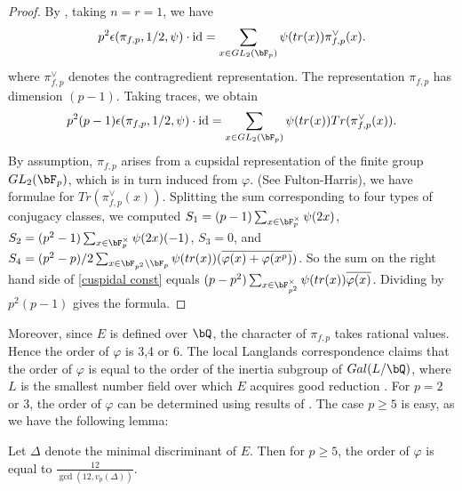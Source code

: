 \documentclass [11pt, proquest] {uwthesis}[2015/03/03]
\begin{document}
\begin{proof}
By \cite{bushnell2006local}, taking $n =  r = 1$, we have 
\begin{equation} 
	p^2 \epsilon(\pi_{f,p}, 1/2, \psi) \cdot \text{id} = \sum_{x \in GL_2(\bF_p)} \psi(tr(x)) \pi_{f,p}^{\vee}(x).
\end{equation}
where $\pi_{f,p}^{\vee}$ denotes the contragredient representation. The representation $\pi_{f,p}$ has dimension $(p-1)$.
Taking traces, we obtain 
\begin{equation} \label{cuspidal const}
	p^2 (p-1) \epsilon(\pi_{f,p}, 1/2, \psi) \cdot \text{id} = \sum_{x \in GL_2(\bF_p)} \psi(tr(x)) Tr(\pi_{f,p}^{\vee}(x)).
\end{equation}
By assumption, $\pi_{f,p}$ arises from a cupsidal representation of the finite group $GL_2(\bF_p)$, which is in turn induced from $\varphi$. (See Fulton-Harris), we have formulae for $Tr(\pi_{f,p}^{\vee}(x))$. Splitting the sum corresponding to four types of conjugacy classes, we computed $S_1 =  (p-1)  \sum_{x \in \bF_p^{\times}} \psi(2x)$, $S_2 = (p^2-1) \sum_{x \in \bF_p^{\times}} \psi(2x) (-1)$, $S_3 = 0$, and $S_4=  (p^2-p)/2 \sum_{x \in \bF_{p^2} \setminus \bF_p} \psi(tr(x))(\overline{\varphi(x) + \varphi(x^p)})$. So the sum on the right hand side of \ref{cuspidal const}  equals $(p-p^2) \sum_{x \in \bF_{p^2}^{\times}} \psi(tr(x)) \overline{\varphi(x)}$. Dividing by $p^2(p-1)$ gives the formula.

\end{proof}

Moreover, since $E$ is defined over $\bQ$, the character of $\pi_{f,p}$ takes rational values. Hence the order of $\varphi$ is 3,4 or 6. The local Langlands correspondence claims that the order of $\varphi$ is equal to the order of the inertia subgroup of $Gal(L/\bQ)$, where $L$ is the smallest number field over which $E$ acquires good reduction . For $p = 2$ or $3$, the order of $\varphi$ can be determined using results of \cite{kraus1990defaut}. 
The case $p \geq 5$ is easy, as we have the following lemma: 

\begin{Lemma}\cite[Proposition 1]{kraus1990defaut}
Let $\Delta$ denote the minimal discriminant of $E$. Then for $p \geq 5$, the order of $\varphi$ is equal to 
$\frac{12}{\gcd(12, v_p(\Delta))}$.
\end{Lemma}


\end{document}
